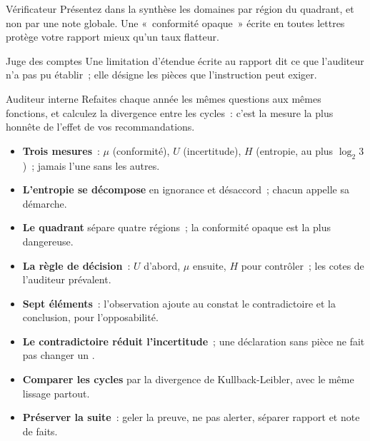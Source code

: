\begin{boxmetier}{Vérificateur}
Présentez dans la synthèse les domaines par région du quadrant, et non par
une note globale. Une «~conformité opaque~» écrite en toutes lettres
protège votre rapport mieux qu'un taux flatteur.
\end{boxmetier}

\begin{boxmetier}{Juge des comptes}
Une limitation d'étendue écrite au rapport dit ce que l'auditeur n'a pas pu
établir~; elle désigne les pièces que l'instruction peut exiger.
\end{boxmetier}

\begin{boxmetier}{Auditeur interne}
Refaites chaque année les mêmes questions aux mêmes fonctions, et calculez
la divergence entre les cycles~: c'est la mesure la plus honnête de
l'effet de vos recommandations.
\end{boxmetier}

\separateur

\begin{boxresume}
\begin{itemize}
    \item \textbf{Trois mesures}~: $\mu$ (conformité), $U$ (incertitude), $H$
          (entropie, au plus $\log_2 3$)~; jamais l'une sans les autres.
    \item \textbf{L'entropie se décompose} en ignorance et désaccord~; chacun
          appelle sa démarche.
    \item \textbf{Le quadrant} sépare quatre régions~; la conformité opaque
          est la plus dangereuse.
    \item \textbf{La règle de décision}~: $U$ d'abord, $\mu$ ensuite, $H$
          pour contrôler~; les cotes de l'auditeur prévalent.
    \item \textbf{Sept éléments}~: l'observation ajoute au constat le
          contradictoire et la conclusion, pour l'opposabilité.
    \item \textbf{Le contradictoire réduit l'incertitude}~; une déclaration
          sans pièce ne fait pas changer un \NON{}.
    \item \textbf{Comparer les cycles} par la divergence de Kullback-Leibler,
          avec le même lissage partout.
    \item \textbf{Préserver la suite}~: geler la preuve, ne pas alerter,
          séparer rapport et note de faits.
\end{itemize}
\end{boxresume}

